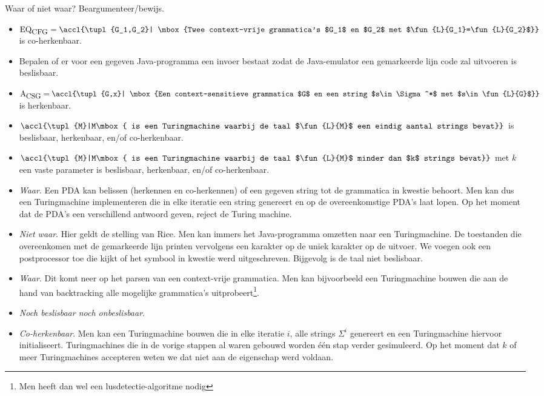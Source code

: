 \documentclass[fleqn]{article}
\begin{document}
\begin{question}
Waar of niet waar? Beargumenteer/bewijs.
\begin{itemize}
 \item $\mbox{EQ}_{\mbox{\small{CFG}}}=\accl{\tupl{G_1,G_2}| \mbox{Twee context-vrije grammatica's $G_1$ en $G_2$ met $\fun{L}{G_1}=\fun{L}{G_2}$}}$ is co-herkenbaar.
 \item Bepalen of er voor een gegeven Java-programma een invoer bestaat zodat de Java-emulator een gemarkeerde lijn code zal uitvoeren is beslisbaar.
 \item $\mbox{A}_{\mbox{\small{CSG}}}=\accl{\tupl{G,x}| \mbox{Een context-sensitieve grammatica $G$ en een string $s\in\Sigma^*$ met $s\in\fun{L}{G}$}}$ is herkenbaar.
 \item $\accl{\tupl{M}|M\mbox{ is een Turingmachine waarbij de taal $\fun{L}{M}$ een eindig aantal strings bevat}}$ is beslisbaar, herkenbaar, en/of co-herkenbaar.
 \item $\accl{\tupl{M}|M\mbox{ is een Turingmachine waarbij de taal $\fun{L}{M}$ minder dan $k$ strings bevat}}$ met $k$ een vaste parameter is beslisbaar, herkenbaar, en/of co-herkenbaar.
\end{itemize}
\end{question}
\begin{answer}\hfill
\begin{itemize}
 \item \textit{Waar}. Een PDA kan belissen (herkennen en co-herkennen) of een gegeven string tot de grammatica in kwestie behoort. Men kan dus een Turingmachine implementeren die in elke iteratie een string genereert en op de overeenkomstige PDA's laat lopen. Op het moment dat de PDA's een verschillend antwoord geven, reject de Turing machine.
 \item \textit{Niet waar}. Hier geldt de stelling van Rice. Men kan immers het Java-programma omzetten naar een Turingmachine. De toestanden die overeenkomen met de gemarkeerde lijn printen vervolgens een karakter op de uniek karakter op de uitvoer. We voegen ook een postprocessor toe die kijkt of het symbool in kwestie werd uitgeschreven. Bijgevolg is de taal niet beslisbaar.
 \item \textit{Waar}. Dit komt neer op het parsen van een context-vrije grammatica. Men kan bijvoorbeeld een Turingmachine bouwen die aan de hand van backtracking alle mogelijke grammatica's uitprobeert\footnote{Men heeft dan wel een lusdetectie-algoritme nodig}.
 \item \textit{Noch beslisbaar noch onbeslisbaar}.
 \item \textit{Co-herkenbaar}. Men kan een Turingmachine bouwen die in elke iteratie $i$, alle strings $\Sigma^i$ genereert en een Turingmachine hiervoor initialiseert. Turingmachines die in de vorige stappen al waren gebouwd worden \'e\'en stap verder gesimuleerd. Op het moment dat $k$ of meer Turingmachines accepteren weten we dat niet aan de eigenschap werd voldaan.
\end{itemize}
\end{answer}
\end{document}
